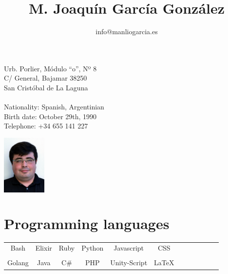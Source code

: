 \documentclass[10pt]{article}
\title{\bfseries M. Joaquín García González}
\author{info@manliogarcia.es}
\date{}
\begin{document}

    \maketitle

    \vspace{4em}

    \begin{minipage}[ht]{0.48\textwidth}
        Urb. Porlier, Módulo ``o'', Nº 8\\
        C/ General, Bajamar 38250\\
        San Cristóbal de La Laguna\\
        \\
        Nationality: Spanish, Argentinian\\
        Birth date: October 29th, 1990\\
        Telephone: +34 655 141 227
    \end{minipage}
    \begin{minipage}[ht]{0.48\textwidth}
        \begin{flushright}
        \includegraphics[height=8em]{profile}
        \end{flushright}
    \end{minipage}

    \vspace{4em}

    \section*{Programming languages}
    \begin{center}
    \begin{tabular}{ c c c c c c c c c c c c }

      Bash & Elixir & Ruby & Python & Javascript & CSS \\\\

         Golang & Java & C\# & PHP & Unity-Script & \LaTeX

    \end{tabular}
    \end{center}
\end{document}
